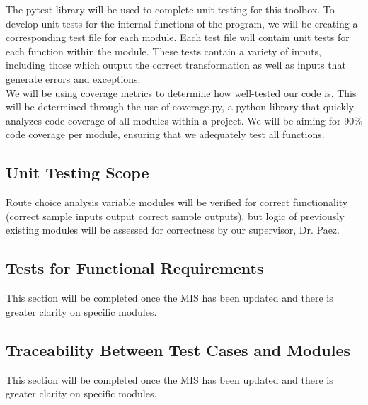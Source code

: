 \documentclass[12pt, titlepage]{article}
\begin{document}
The pytest library will be used to complete unit testing for this toolbox. To develop unit tests for the internal functions of the program, we will be creating a corresponding test file for each module. Each test file will contain unit tests for each function within the module. These tests contain a variety of inputs, including those which output the correct transformation as well as inputs that generate errors and exceptions. \\

\noindent We will be using coverage metrics to determine how well-tested our code is. This will be determined through the use of coverage.py, a python library that quickly analyzes code coverage of all modules within a project. We will be aiming for 90\% code coverage per module, ensuring that we adequately test all functions. 

\subsection{Unit Testing Scope}

Route choice analysis variable modules will be verified for correct functionality (correct sample inputs output correct sample outputs), but logic of previously existing modules will be assessed for correctness by our supervisor, Dr. Paez.

\subsection{Tests for Functional Requirements}

This section will be completed once the MIS has been updated and there is greater clarity on specific modules. 

\subsection{Traceability Between Test Cases and Modules}
This section will be completed once the MIS has been updated and there is greater clarity on specific modules. 
				
\end{document}
